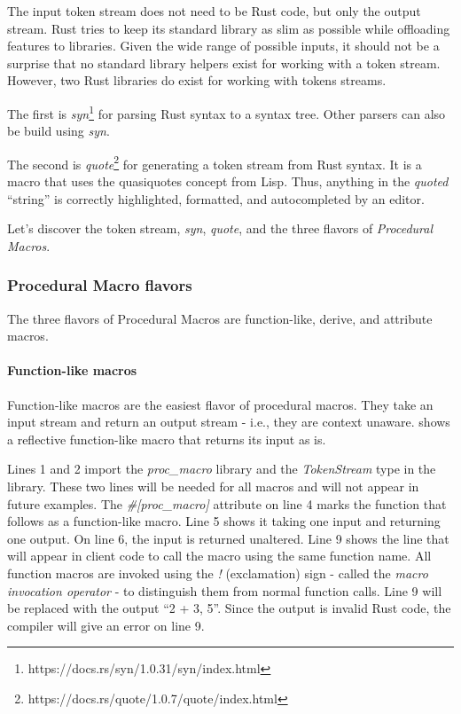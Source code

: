 The input token stream does not need to be Rust code, but only the output stream.
Rust tries to keep its standard library as slim as possible while offloading features to libraries.
Given the wide range of possible inputs, it should not be a surprise that no standard library helpers exist for working with a token stream.
However, two Rust libraries do exist for working with tokens streams.

The first is \textit{syn}\footnote{https://docs.rs/syn/1.0.31/syn/index.html} for parsing Rust syntax to a syntax tree.
Other parsers can also be build using \textit{syn}.

The second is \textit{quote}\footnote{https://docs.rs/quote/1.0.7/quote/index.html} for generating a token stream from Rust syntax.
It is a macro that uses the quasiquotes concept from Lisp.
Thus, anything in the \textit{quoted} ``string'' is correctly highlighted, formatted, and autocompleted by an editor.

Let's discover the token stream, \textit{syn}, \textit{quote}, and the three flavors of \textit{Procedural Macros}.

\subsubsection{Procedural Macro flavors}

The three flavors of Procedural Macros are function-like, derive, and attribute macros.

\paragraph{Function-like macros}
Function-like macros are the easiest flavor of procedural macros.
They take an input stream and return an output stream - i.e., they are context unaware.
 shows a reflective function-like macro that returns its input as is.


Lines 1 and 2 import the \textit{proc\_macro} library and the \textit{TokenStream} type in the library.
These two lines will be needed for all macros and will not appear in future examples.
The \textit{\#[proc\_macro]} attribute on line 4 marks the function that follows as a function-like macro.
Line 5 shows it taking one \colorbox{input}{input} and returning one \colorbox{output}{output}.
On line 6, the input is returned unaltered.
Line 9 shows the line that will appear in client code to call the macro using the same \colorbox{function}{function name}.
All function macros are invoked using the \textit{!} (exclamation) sign - called the \textit{macro invocation operator} - to distinguish them from normal function calls.
Line 9 will be replaced with the \colorbox{output}{output} ``2 + 3, 5''.
Since the output is invalid Rust code, the compiler will give an error on line 9.

